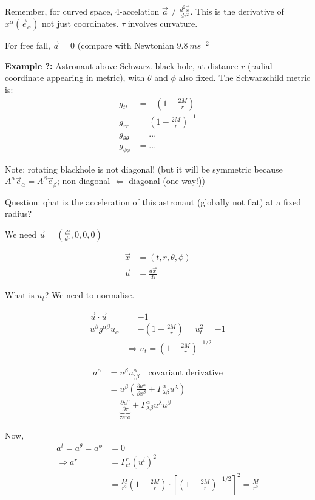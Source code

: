 \documentclass[a4paper]{article} %
\newcommand{\example}[2]
{
\begin{framed}
\textbf{Example #1:} #2
\end{framed}
}
\begin{document}
Remember, for curved space, 4-accelation $\vec{a}\neq\frac{d^2\vec{x}}{d\tau^2}$. This is the derivative of $x^{\alpha}(\vec{e}_{\alpha})$ not just coordinates. $\tau$ involves curvature.

For free fall, $\vec{a}=0$ (compare with Newtonian $\SI{9.8}{ms^{-2}}$

\example{?}{Astronaut above Schwarz. black hole, at distance $r$ (radial coordinate appearing in metric), with $\theta$ and $\phi$ also fixed. The Schwarzchild metric is:
\begin{align}
g_{tt}&=-\left(1-\frac{2M}{r}\right)\\
g_{rr}&=\left(1-\frac{2M}{r}\right)^{-1}\\
g_{\theta\theta}&=...\\
g_{\phi\phi}&=...
\end{align}

Note: rotating blackhole is not diagonal! (but it will be symmetric because $A^{\alpha}\vec{e}_{\alpha}=A^{\beta}\vec{e}_{\beta}$; non-diagonal $\Leftarrow$ diagonal (one way!))

Question: qhat is the acceleration of this astronaut (globally not flat) at a fixed radius?

We need $\vec{u}=\left(\frac{dt}{d\tau},0,0,0\right)$

\begin{align}
\vec{x}&=(t,r,\theta,\phi)\\
\vec{u}&=\frac{d\vec{x}}{d\tau}
\end{align}

What is $u_t$? We need to normalise.

\begin{align}
\vec{u}\cdot\vec{u}&=-1\\
u^\beta g^{\alpha\beta}u_{\alpha}&=-\left(1-\frac{2M}{r}\right)=u_t^2=-1\\
&\Rightarrow u_t=\left(1-\frac{2M}{r}\right)^{-1/2}
\end{align}

\begin{align}
a^{\alpha}&=u^{\beta}u^{\alpha}_{;\beta}\quad\text{covariant derivative}\\
&=u^{\beta}\left(\frac{\partial u^{\alpha}}{\partial x^{\beta}}+\Gamma^{\alpha}_{\lambda\beta}u^{\lambda}\right)\\
&=\underbrace{\frac{\partial u^{\alpha}}{\partial\tau}}_{\text{zero}}+\Gamma^{\alpha}_{\lambda\beta}u^{\lambda}u^{\beta}
\end{align}

Now,
\begin{align}
a^t=a^{\theta}=a^{\phi}&=0\\
\Rightarrow a^{r}&=\Gamma^{r}_{tt}(u^t)^2\\
&=\frac{M}{r^2}\left(1-\frac{2M}{r}\right)\cdot\left[\left(1-\frac{2M}{r}\right)^{-1/2}\right]^2=\frac{M}{r^2}
\end{align}

}
\end{document}
